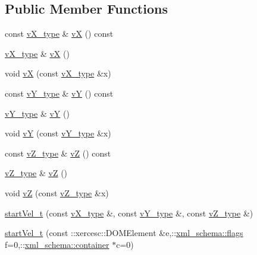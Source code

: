 \subsection*{Public Member Functions}
\begin{DoxyCompactItemize}
\item 
const \hyperlink{classstartVel__t_a4f5683f832e22f177e3dd87c931333fb}{v\-X\-\_\-type} \& \hyperlink{classstartVel__t_a2e0e855a19bf778c9cde1229bef37b3a}{v\-X} () const 
\item 
\hyperlink{classstartVel__t_a4f5683f832e22f177e3dd87c931333fb}{v\-X\-\_\-type} \& \hyperlink{classstartVel__t_ad3d45c87d3610012e06f2deead93bbbf}{v\-X} ()
\item 
void \hyperlink{classstartVel__t_a4ff02721e075f93b8fc7e0455e4a6519}{v\-X} (const \hyperlink{classstartVel__t_a4f5683f832e22f177e3dd87c931333fb}{v\-X\-\_\-type} \&x)
\item 
const \hyperlink{classstartVel__t_ae5903806f237d8ceddf10c273a3d2002}{v\-Y\-\_\-type} \& \hyperlink{classstartVel__t_a02b1baab247973fb9135d719ade4d950}{v\-Y} () const 
\item 
\hyperlink{classstartVel__t_ae5903806f237d8ceddf10c273a3d2002}{v\-Y\-\_\-type} \& \hyperlink{classstartVel__t_aa479e73253b8ae96811796d9e8dc8435}{v\-Y} ()
\item 
void \hyperlink{classstartVel__t_af3e8d9b362c5f786a4262f890ec4bce5}{v\-Y} (const \hyperlink{classstartVel__t_ae5903806f237d8ceddf10c273a3d2002}{v\-Y\-\_\-type} \&x)
\item 
const \hyperlink{classstartVel__t_ae5f77efcbc29e3290d1f36cb89fbd2bf}{v\-Z\-\_\-type} \& \hyperlink{classstartVel__t_a6d4c46e125ae7cc854b115364bddac15}{v\-Z} () const 
\item 
\hyperlink{classstartVel__t_ae5f77efcbc29e3290d1f36cb89fbd2bf}{v\-Z\-\_\-type} \& \hyperlink{classstartVel__t_a1e0414794377e90b7ac9bdebb809ca27}{v\-Z} ()
\item 
void \hyperlink{classstartVel__t_afaf5b530eef1640b63dc0e898bc3b0bc}{v\-Z} (const \hyperlink{classstartVel__t_ae5f77efcbc29e3290d1f36cb89fbd2bf}{v\-Z\-\_\-type} \&x)
\item 
\hyperlink{classstartVel__t_a174d2b2af5d886bb1cb0bca8ef8e53b2}{start\-Vel\-\_\-t} (const \hyperlink{classstartVel__t_a4f5683f832e22f177e3dd87c931333fb}{v\-X\-\_\-type} \&, const \hyperlink{classstartVel__t_ae5903806f237d8ceddf10c273a3d2002}{v\-Y\-\_\-type} \&, const \hyperlink{classstartVel__t_ae5f77efcbc29e3290d1f36cb89fbd2bf}{v\-Z\-\_\-type} \&)
\item 
\hyperlink{classstartVel__t_a83c09349ea73c7980b5dedddf8a68939}{start\-Vel\-\_\-t} (const \-::xercesc\-::\-D\-O\-M\-Element \&e,\-::\hyperlink{namespacexml__schema_a0612287d030cb2732d31a45b258fdc87}{xml\-\_\-schema\-::flags} f=0,\-::\hyperlink{namespacexml__schema_ada9aa30dc722e93ee2ed7243085402a5}{xml\-\_\-schema\-::container} $\ast$c=0)

\end{DoxyCompactItemize}
